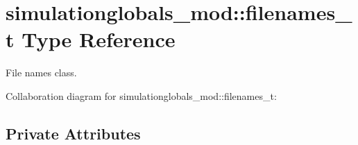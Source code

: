 \hypertarget{structsimulationglobals__mod_1_1filenames__t}{}\section{simulationglobals\+\_\+mod\+:\+:filenames\+\_\+t Type Reference}
\label{structsimulationglobals__mod_1_1filenames__t}


File names class.  




Collaboration diagram for simulationglobals\+\_\+mod\+:\+:filenames\+\_\+t\+:
\subsection*{Private Attributes}
